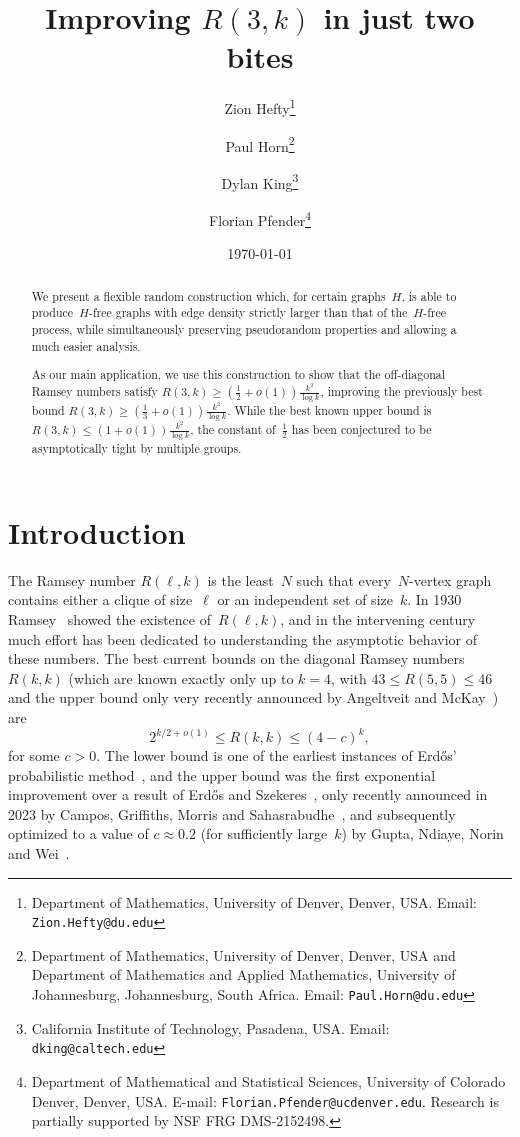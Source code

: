 \documentclass{article}
\title{Improving {$R(3,k)$} in just two bites}
\author{ Zion Hefty\thanks{Department of Mathematics, University of Denver, Denver, USA. Email: {\tt Zion.Hefty@du.edu}}
\and  Paul Horn\thanks{Department of Mathematics, University of Denver, Denver, USA and Department of Mathematics and Applied Mathematics, University of Johannesburg, Johannesburg, South Africa. Email: {\tt Paul.Horn@du.edu}} 
\and Dylan King\thanks{California Institute of Technology, Pasadena, USA. Email: {\tt dking@caltech.edu}} 
\and Florian Pfender\thanks{Department of Mathematical and Statistical Sciences, University of Colorado Denver, Denver, USA. E-mail: {\tt Florian.Pfender@ucdenver.edu}. Research is partially supported by NSF FRG DMS-2152498.}}
\date{\today}
\begin{document}
\maketitle
{}

\begin{abstract}
We present a flexible random construction which, for certain graphs~$H$, is able to produce~$H$-free graphs with edge density strictly larger than that of the~$H$-free process, while simultaneously preserving pseudorandom properties and allowing a much easier analysis.

As our main application, we use this construction to show that the off-diagonal Ramsey numbers satisfy $R(3,k)\ge  \left(\frac12+o(1)\right)\frac{k^2}{\log{k}}$, improving the previously best bound $R(3,k)\ge  \left(\frac13+o(1)\right)\frac{k^2}{\log{k}}$. 
While the best known upper bound is~$R(3,k)\le  \left(1+o(1)\right)\frac{k^2}{\log{k}}$, the constant of~$\frac12$ has been conjectured to be asymptotically tight by multiple groups.
\end{abstract}



\section{Introduction}
The Ramsey number $R(\ell,k)$ is the least~$N$ such that every~$N$-vertex graph contains either a clique of size~$\ell$ or an independent set of size~$k$.
In 1930 Ramsey~\cite{Ramsey1930} showed the existence of~$R(\ell,k)$, and in the intervening century much effort has been dedicated to understanding the asymptotic behavior of these numbers.
The best current bounds on the diagonal Ramsey numbers $R(k,k)$ (which are known exactly only up to $k=4$, with $43\le R(5,5)\le 46$ and the upper bound only very recently announced by Angeltveit and McKay~\cite{angeltveit2025}) are
\[
2^{k/2+o(1)}\le R(k,k)\le (4-c)^k,
\]
for some $c>0$.
The lower bound is one of the earliest instances of Erd\H{o}s' probabilistic method~\cite{Erdos47}, and the upper bound was the first exponential improvement over a result of Erd\H{o}s and Szekeres~\cite{ES35}, only recently announced in 2023 by Campos, Griffiths, Morris and Sahasrabudhe~\cite{campos2025exponentialimprovementdiagonalramsey}, and subsequently optimized to a value of $c\approx 0.2$ (for sufficiently large~$k$) by Gupta, Ndiaye, Norin and Wei~\cite{gupta2024optimizingcgmsupperbound}.
\end{document}
